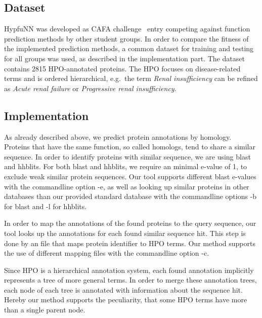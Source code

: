 \subsection{Dataset}

HypfuNN was developed as CAFA challenge~\citep{CAFA} entry competing against function prediction methods by other student groups. In order to compare the fitness of the implemented prediction methods, a common
dataset for training and testing for all groups was used, as described in the implementation part. The dataset contains 2815 HPO-annotated proteins. The HPO focuses on disease-related terms and is ordered
hierarchical, e.g.~the term \textit{Renal insufficiency} can be refined as \textit{Acute renal failure} or \textit{Progressive renal insufficiency}.


\subsection{Implementation}

As already described above, we predict protein annotations by homology. Proteins that have the same function, so called homologs, tend to share a similar sequence. In order to identify proteins
with similar sequence, we are using blast and hhblits. For both blast and hhblits, we require an minimal e-value of 1, to exclude weak similar protein sequences. Our tool supports different blast e-values with the commandline option -e, as well as looking up similar proteins in other databases than our provided standard database with the commandline options -b for blast and -l for hhblits.

In order to map the annotations of the found proteins to the query sequence, our tool looks up the annotations for each found similar sequence hit. This step is done by an file that maps protein identifier to HPO terms. Our method supports the use of different mapping files with the commandline option -c.

Since HPO is a hierarchical annotation system, each found annotation implicitly represents a tree of more general terms. In order to merge these annotation trees, each node of each tree is annotated with information about the sequence hit. Hereby our method supports the peculiarity, that some HPO terms have more than a single parent node.


